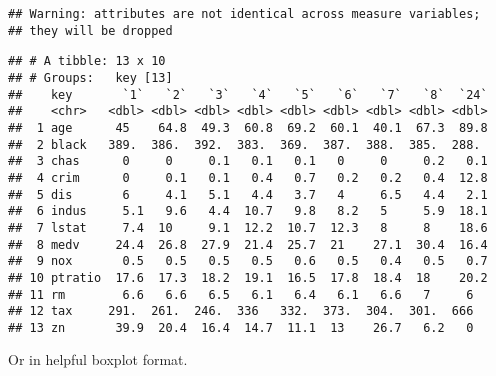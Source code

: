 \documentclass[]{book}
\newenvironment{Shaded}{\begin{snugshade}}{\end{snugshade}}
\newcommand{\KeywordTok}[1]{\textcolor[rgb]{0.13,0.29,0.53}{\textbf{#1}}}
\newcommand{\DataTypeTok}[1]{\textcolor[rgb]{0.13,0.29,0.53}{#1}}
\newcommand{\DecValTok}[1]{\textcolor[rgb]{0.00,0.00,0.81}{#1}}
\newcommand{\FloatTok}[1]{\textcolor[rgb]{0.00,0.00,0.81}{#1}}
\newcommand{\StringTok}[1]{\textcolor[rgb]{0.31,0.60,0.02}{#1}}
\newcommand{\OperatorTok}[1]{\textcolor[rgb]{0.81,0.36,0.00}{\textbf{#1}}}
\newcommand{\NormalTok}[1]{#1}
\begin{document}
\begin{verbatim}
## Warning: attributes are not identical across measure variables;
## they will be dropped
\end{verbatim}

\begin{verbatim}
## # A tibble: 13 x 10
## # Groups:   key [13]
##    key       `1`   `2`   `3`   `4`   `5`   `6`   `7`   `8`  `24`
##    <chr>   <dbl> <dbl> <dbl> <dbl> <dbl> <dbl> <dbl> <dbl> <dbl>
##  1 age      45    64.8  49.3  60.8  69.2  60.1  40.1  67.3  89.8
##  2 black   389.  386.  392.  383.  369.  387.  388.  385.  288. 
##  3 chas      0     0     0.1   0.1   0.1   0     0     0.2   0.1
##  4 crim      0     0.1   0.1   0.4   0.7   0.2   0.2   0.4  12.8
##  5 dis       6     4.1   5.1   4.4   3.7   4     6.5   4.4   2.1
##  6 indus     5.1   9.6   4.4  10.7   9.8   8.2   5     5.9  18.1
##  7 lstat     7.4  10     9.1  12.2  10.7  12.3   8     8    18.6
##  8 medv     24.4  26.8  27.9  21.4  25.7  21    27.1  30.4  16.4
##  9 nox       0.5   0.5   0.5   0.5   0.6   0.5   0.4   0.5   0.7
## 10 ptratio  17.6  17.3  18.2  19.1  16.5  17.8  18.4  18    20.2
## 11 rm        6.6   6.6   6.5   6.1   6.4   6.1   6.6   7     6  
## 12 tax     291.  261.  246.  336   332.  373.  304.  301.  666  
## 13 zn       39.9  20.4  16.4  14.7  11.1  13    26.7   6.2   0
\end{verbatim}

Or in helpful boxplot format.

\begin{Shaded}
\end{Shaded}
\end{document}
